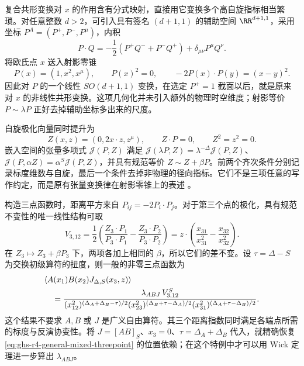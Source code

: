 复合共形变换对 $x$ 的作用含有分式映射，直接用它变换多个高自旋指标相当繁琐。对任意整数 $d>2$，可引入具有签名 $(d+1,1)$ 的辅助空间 $\RR^{d+1,1}$，采用坐标 $P^A=(P^+,P^-,P^\mu)$，内积
\begin{equation}\label{eq:ghs-r4-embedding-inner-product}
 P\cdot Q=-\frac12(P^+Q^-+P^-Q^+)+\delta_{\mu\nu}P^\mu Q^\nu.
\end{equation}
将欧氏点 $x$ 送入射影零锥
\begin{equation}\label{eq:ghs-r4-embedding-section}
 P(x)=(1,x^2,x^\mu),\qquad P(x)^2=0,\qquad
 -2P(x)\cdot P(y)=(x-y)^2.
\end{equation}
因此对 $P$ 的一个线性 $SO(d+1,1)$ 变换，在选定 $P^+=1$ 截面以后，就是原来对 $x$ 的非线性共形变换。这项几何化并未引入额外的物理时空维度；射影等价 $P\sim\lambda P$ 正好去掉辅助坐标多出来的尺度。

自旋极化向量同时提升为
\begin{equation}\label{eq:ghs-r4-embedding-polarization}
 Z(x,z)=(0,2x\cdot z,z^\mu),\qquad
 Z\cdot P=0,\qquad Z^2=z^2=0.
\end{equation}
嵌入空间的张量多项式 $\mathcal J(P,Z)$ 满足 $\mathcal J(\lambda P,Z)=\lambda^{-\Delta}\mathcal J(P,Z)$、$\mathcal J(P,\alpha Z)=\alpha^S\mathcal J(P,Z)$，并具有规范等价 $Z\sim Z+\beta P$。前两个齐次条件分别记录标度维数与自旋，最后一个条件去掉非物理的径向指标。它们不是三项任意的写作约定，而是原有张量变换律在射影零锥上的表述 \cite{ghs-costa}。


构造三点函数时，距离平方来自 $P_{ij}=-2P_i\cdot P_j$。对于第三个点的极化，具有规范不变性的唯一线性结构可取
\begin{equation}\label{eq:ghs-r4-embedding-V}
 V_{3,12}=\frac12\left(\frac{Z_3\cdot P_1}{P_3\cdot P_1}
 -\frac{Z_3\cdot P_2}{P_3\cdot P_2}\right)
 =z\cdot\left(\frac{x_{31}}{x_{31}^2}-\frac{x_{32}}{x_{32}^2}\right).
\end{equation}
在 $Z_3\mapsto Z_3+\beta P_3$ 下，两项各加上相同的 $\beta$，所以它们的差不变。设 $\tau=\Delta-S$ 为交换初级算符的扭度，则一般的非零三点函数为
\begin{align}\label{eq:ghs-r4-general-ssj-three-point}
 &\langle A(x_1)B(x_2)J_{\Delta,S}(x_3,z)\rangle\\
 &\quad=\frac{\lambda_{ABJ}\,V_{3,12}^S}
 {(x_{12}^2)^{(\Delta_A+\Delta_B-\tau)/2}
 (x_{23}^2)^{(\Delta_B+\tau-\Delta_A)/2}
 (x_{31}^2)^{(\Delta_A+\tau-\Delta_B)/2}}.\notag
\end{align}
这个结果不要求 $A,B$ 或 $J$ 是广义自由算符。其三个距离指数同时满足各端点所需的标度与反演协变性。将 $J=[AB]_S$、$x_3=0$、$\tau=\Delta_A+\Delta_B$ 代入，就精确恢复 \cref{eq:ghs-r4-general-mixed-threepoint} 的位置依赖；在这个特例中才可以用 Wick 定理进一步算出 $\lambda_{ABJ}$。


